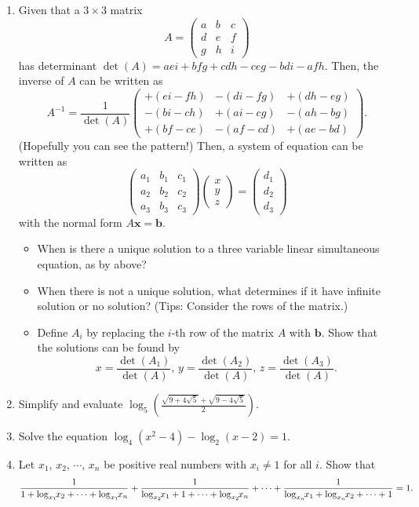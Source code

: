 \documentclass{article}
\newcommand{\prestar}{\vspace*{0.3em}\hspace*{\fill}}
\newcommand{\onestar}{\marginpar{\prestar\textcolor{red}{$\ast$}}}
\begin{document}
\begin{enumerate}
\item \onestar Given that a $3\times 3$ matrix \[A=\begin{pmatrix}a & b & c\\d & e & f\\ g & h & i\end{pmatrix}\] has determinant $\det(A)=aei+bfg+cdh-ceg-bdi-afh$. Then, the inverse of $A$ can be written as \[A^{-1}=\frac{1}{\det(A)}\begin{pmatrix}+(ei-fh) & -(di-fg) & +(dh-eg)\\-(bi-ch) & +(ai-cg) & -(ah-bg)\\ +(bf-ce) & -(af-cd) & +(ae-bd)\end{pmatrix}.\](Hopefully you can see the pattern!) Then, a system of equation can be written as \[\begin{pmatrix}a_1 & b_1 & c_1\\a_2 & b_2 & c_2\\ a_3 & b_3 & c_3\end{pmatrix}\begin{pmatrix}x\\y\\z\end{pmatrix}=\begin{pmatrix}d_1 \\ d_2 \\ d_3\end{pmatrix}\]
with the normal form $A\mathbf{x}=\mathbf{b}$.
       \begin{itemize}
              \item[(a)] When is there a unique solution to a three variable linear simultaneous equation, as by above?
              \item[(b)] When there is not a unique solution, what determines if it have infinite solution or no solution? (Tips: Consider the rows of the matrix.)
              \item[(c)] Define $A_i$ by replacing the $i$-th row of the matrix $A$ with $\mathbf{b}$. Show that the solutions can be found by \[x=\frac{\det(A_1)}{\det(A)}\text{, }y=\frac{\det(A_2)}{\det(A)}\text{, }z=\frac{\det(A_3)}{\det(A)}.\]
       \end{itemize}
\item Simplify and evaluate $\log_5\left(\frac{\sqrt{9+4\sqrt{5}}+\sqrt{9-4\sqrt{5}}}{2}\right)$.
\item Solve the equation $\log_4(x^2-4)-\log_2(x-2)=1$.
\item Let $x_1$, $x_2$, $\cdots$, $x_n$ be positive real numbers with $x_i\neq 1$ for all $i$. Show that \footnotesize\[\frac{1}{1+\log_{x_1\hspace{-3pt}}x_2+\cdots+\log_{x_1\hspace{-3pt}}x_n}+\frac{1}{\log_{x_2\hspace{-3pt}}x_1+1+\cdots+\log_{x_2\hspace{-3pt}}x_n}+\cdots+\frac{1}{\log_{x_n\hspace{-3pt}}x_1+\log_{x_n\hspace{-3pt}}x_2+\cdots+1}=1.\]\normalsize

\end{enumerate}
\end{document}

